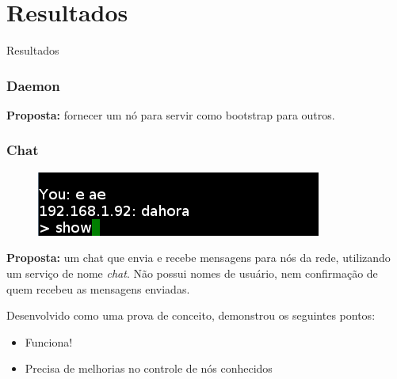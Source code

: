 \documentclass[brazil]{beamer}
\begin{document}
\section{Resultados}
\begin{frame}
  \begin{center}
    \huge{Resultados}
  \end{center}
\end{frame}
\begin{frame}
  \frametitle{Daemon}
  
  
  \vspace{10pt}
  
  \textbf{Proposta:} fornecer um nó para servir como bootstrap para outros.
  
\end{frame}
\begin{frame}
  \frametitle{Chat}
  
  \begin{figure}
  \includegraphics{chat.png}
  \end{figure}
  
  \pause
  
  \textbf{Proposta:} um chat que envia e recebe mensagens para nós da rede, utilizando
  um serviço de nome \textit{chat}. Não possui nomes de usuário, nem confirmação
  de quem recebeu as mensagens enviadas.
  
  \vspace{10pt}
  \pause
 
  Desenvolvido como uma prova de conceito, demonstrou os seguintes pontos:
  \begin{itemize}
    \pause
    \item Funciona!
    \pause
    \item Precisa de melhorias no controle de nós conhecidos
  \end{itemize}
\end{frame}
\end{document}
